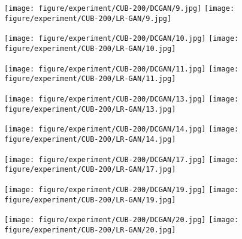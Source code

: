 \documentclass{article} \usepackage{iclr2017_conference,times}
\begin{document}
\begin{figure}[b]
\begin{minipage}{0.12\linewidth}
\texttt{[image: figure/experiment/CUB-200/DCGAN/9.jpg]}
\texttt{[image: figure/experiment/CUB-200/LR-GAN/9.jpg]}
\vspace{0.05cm}
\end{minipage}
\begin{minipage}{0.12\linewidth}
\texttt{[image: figure/experiment/CUB-200/DCGAN/10.jpg]}
\texttt{[image: figure/experiment/CUB-200/LR-GAN/10.jpg]}
\vspace{0.05cm}
\end{minipage}
\begin{minipage}{0.12\linewidth}
\texttt{[image: figure/experiment/CUB-200/DCGAN/11.jpg]}
\texttt{[image: figure/experiment/CUB-200/LR-GAN/11.jpg]}
\vspace{0.05cm}
\end{minipage}
\begin{minipage}{0.12\linewidth}
\texttt{[image: figure/experiment/CUB-200/DCGAN/13.jpg]}
\texttt{[image: figure/experiment/CUB-200/LR-GAN/13.jpg]}
\vspace{0.05cm}
\end{minipage}
\begin{minipage}{0.12\linewidth}
\texttt{[image: figure/experiment/CUB-200/DCGAN/14.jpg]}
\texttt{[image: figure/experiment/CUB-200/LR-GAN/14.jpg]}
\vspace{0.05cm}
\end{minipage}
\begin{minipage}{0.12\linewidth}
\texttt{[image: figure/experiment/CUB-200/DCGAN/17.jpg]}
\texttt{[image: figure/experiment/CUB-200/LR-GAN/17.jpg]}
\vspace{0.05cm}
\end{minipage}
\begin{minipage}{0.12\linewidth}
\texttt{[image: figure/experiment/CUB-200/DCGAN/19.jpg]}
\texttt{[image: figure/experiment/CUB-200/LR-GAN/19.jpg]}
\vspace{0.05cm}
\end{minipage}
\begin{minipage}{0.12\linewidth}
\texttt{[image: figure/experiment/CUB-200/DCGAN/20.jpg]}
\texttt{[image: figure/experiment/CUB-200/LR-GAN/20.jpg]}
\vspace{0.05cm}
\end{minipage}


\end{figure}
\end{document}
